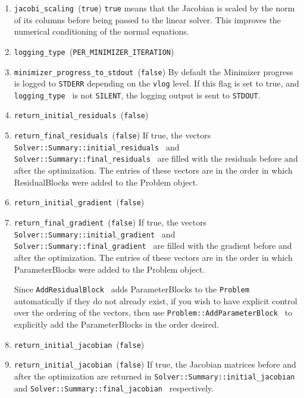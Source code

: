 \begin{enumerate}
\item{\texttt{jacobi\_scaling }}(\texttt{true}) \texttt{true} means
  that the Jacobian is scaled by the norm of its columns before being
  passed to the linear solver. This improves the numerical
  conditioning of the normal equations.

\item{\texttt{logging\_type }}(\texttt{PER\_MINIMIZER\_ITERATION})


\item{\texttt{minimizer\_progress\_to\_stdout }}(\texttt{false})
By default the Minimizer progress is logged to \texttt{STDERR}
depending on the \texttt{vlog} level. If this flag is
set to true, and \texttt{logging\_type } is not \texttt{SILENT}, the
logging output
is sent to \texttt{STDOUT}.

\item{\texttt{return\_initial\_residuals }}(\texttt{false})
\item{\texttt{return\_final\_residuals }}(\texttt{false})
If true, the vectors \texttt{Solver::Summary::initial\_residuals } and
\texttt{Solver::Summary::final\_residuals } are filled with the
residuals before and after the optimization. The entries of these
vectors are in the order in which ResidualBlocks were added to the
Problem object.

\item{\texttt{return\_initial\_gradient }}(\texttt{false})
\item{\texttt{return\_final\_gradient }}(\texttt{false})
If true, the vectors \texttt{Solver::Summary::initial\_gradient } and
\texttt{Solver::Summary::final\_gradient } are filled with the
gradient before and after the optimization. The entries of these
vectors are in the order in which ParameterBlocks were added to the
Problem object.

Since \texttt{AddResidualBlock } adds ParameterBlocks to the
\texttt{Problem } automatically if they do not already exist, if you
wish to have explicit control over the ordering of the vectors, then
use \texttt{Problem::AddParameterBlock } to explicitly add the
ParameterBlocks in the order desired.

\item{\texttt{return\_initial\_jacobian }}(\texttt{false})
\item{\texttt{return\_initial\_jacobian }}(\texttt{false})
If true, the Jacobian matrices before and after the optimization are
returned in \texttt{Solver::Summary::initial\_jacobian } and
\texttt{Solver::Summary::final\_jacobian } respectively.


\end{enumerate}
